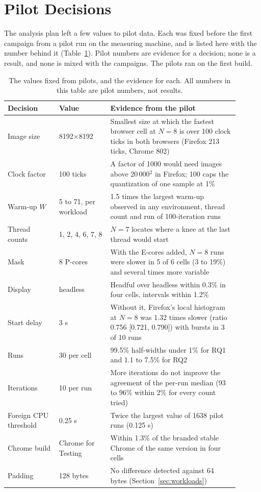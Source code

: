 \section{Pilot Decisions}
\label{sec:pilots}

The analysis plan left a few values to pilot data. Each was fixed before
the first campaign from a pilot run on the measuring machine, and is listed
here with the number behind it (Table~\ref{tab:pilots}). Pilot numbers are
evidence for a decision; none is a result, and none is mixed with the
campaigns. The pilots ran on the first build.

\begin{table}[htbp]
\caption{The values fixed from pilots, and the evidence for each. All
numbers in this table are pilot numbers, not results.}
\label{tab:pilots}
\centering\footnotesize
\begin{tabular}{p{0.2\linewidth}p{0.2\linewidth}p{0.5\linewidth}}
\toprule
Decision & Value & Evidence from the pilot \\
\midrule
Image size & 8192$\times$8192 & Smallest size at which the fastest browser cell at $N=8$ is over 100 clock ticks in both browsers (Firefox 213 ticks, Chrome 802) \\
Clock factor & 100 ticks & A factor of 1000 would need images above 20\,000$^2$ in Firefox; 100 caps the quantization of one sample at 1\% \\
Warm-up $W$ & 5 to 71, per workload & 1.5 times the largest warm-up observed in any environment, thread count and run of 100-iteration runs \\
Thread counts & 1, 2, 4, 6, 7, 8 & $N=7$ locates where a knee at the last thread would start \\
Mask & 8 P-cores & With the E-cores added, $N=8$ runs were slower in 5 of 6 cells (3 to 19\%) and several times more variable \\
Display & headless & Headful over headless within 0.3\% in four cells, intervals within 1.2\% \\
Start delay & 3 s & Without it, Firefox's local histogram at $N=8$ was 1.32 times slower (ratio 0.756 [0.721, 0.790]) with bursts in 3 of 10 runs \\
Runs & 30 per cell & 99.5\% half-widths under 1\% for RQ1 and 1.1 to 7.5\% for RQ2 \\
Iterations & 10 per run & More iterations do not improve the agreement of the per-run median (93 to 96\% within 2\% for every count tried) \\
Foreign CPU threshold & 0.25 s & Twice the largest value of 1638 pilot runs (0.125 s) \\
Chrome build & Chrome for Testing & Within 1.3\% of the branded stable Chrome of the same version in four cells \\
Padding & 128 bytes & No difference detected against 64 bytes (Section~\ref{sec:workloads}) \\
\bottomrule
\end{tabular}
\end{table}

